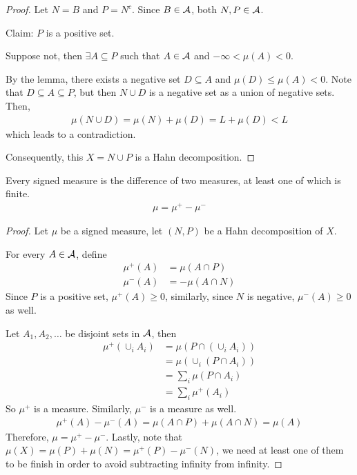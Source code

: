 \documentclass[11pt]{article}
\begin{document}
\begin{theorem}
\begin{proof}
			Let $N = B$ and $P = N^c$. Since $B \in \mathcal{{A}}$, both $N, P \in \mathcal{{A}}$.
			\begin{tcolorbox}
				Claim: $P$ is a positive set.
				
				Suppose not, then $\exists A \subseteq P$ such that $A \in \mathcal{{A}}$ and $-\infty < \mu(A) < 0$.
				
				By the lemma, there exists a negative set $D \subseteq A$ and $\mu(D) \leq \mu(A) < 0$. Note that $D \subseteq A \subseteq P$, but then $N \cup D$ is a negative set as a union of negative sets.
				Then,
				\begin{align}
					\mu(N \cup D) = \mu(N) + \mu(D)
					= L + \mu(D) < L
				\end{align}
				which leads to a contradiction.
			\end{tcolorbox}
			Consequently, this $X = N \cup P$ is a Hahn decomposition.
		\end{proof}
	\end{theorem}
	
	\begin{theorem}
		Every signed measure is the difference of two measures, at least one of which is finite.
		\begin{align}
			\mu = \mu^+ - \mu^-
		\end{align}
		\begin{proof}
			Let $\mu$ be a signed measure, let $(N, P)$ be a Hahn decomposition of $X$.
			
			For every $A \in \mathcal{{A}}$, define
			{\color{red}\begin{align}
				\mu^+(A) &= \mu(A \cap P) \\
				\mu^-(A) &= - \mu(A \cap N)
			\end{align}}
			Since $P$ is a positive set, $\mu^+(A) \geq 0$, similarly, since $N$ is negative, $\mu^-(A) \geq 0$ as well.
			
			Let $A_1, A_2, \dots$ be disjoint sets in $\mathcal{{A}}$, then
			\begin{align}
				\mu^+(\cup_i A_i) &= \mu(P \cap (\cup_i A_i)) \\
				&= \mu(\cup_i (P \cap A_i)) \\
				&= \sum_i \mu(P \cap A_i) \\
				&= \sum_i \mu^+(A_i)
			\end{align}
			So $\mu^+$ is a measure. Similarly, $\mu^-$ is a measure as well.
			\begin{align}
				\mu^+(A) - \mu^-(A) = \mu(A \cap P) + \mu(A \cap N) = \mu(A)
			\end{align}
			Therefore, $\mu = \mu^+ - \mu^-$. Lastly, note that $\mu(X) = \mu(P) + \mu(N) = \mu^+(P) - \mu^-(N)$, we need at least one of them to be finish in order to avoid subtracting infinity from infinity.
		\end{proof}
	\end{theorem}
	
\end{document}
